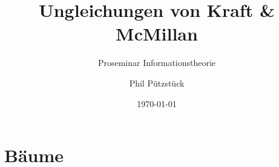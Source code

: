 \documentclass{beamer}
\title{Ungleichungen von Kraft \& McMillan}
\subtitle{Proseminar Informationstheorie}
\author{Phil Pützstück}
\date{\today}
\begin{document}
\maketitle

\section{Bäume}
%
%
\end{document}
